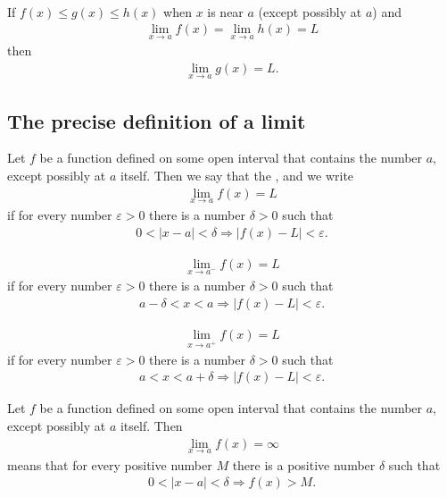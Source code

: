 \documentclass{article}
\begin{document}
\begin{theorem}
    \\
    If $f(x)\leq g(x)\leq h(x)$ when $x$ is near $a$ (except possibly at $a$) and
    \begin{align*}
        \lim_{x\to a}f(x) = \lim_{x\to a}h(x) = L
    \end{align*}
    then
    \begin{align*}
        \lim_{x \to a}g(x) = L.
    \end{align*}
\end{theorem}
\subsection{The precise definition of a limit}
\begin{definition}
    Let $f$ be a function defined on some open interval that contains the number $a$, except possibly at $a$ itself. Then we say that the , and we write
    \begin{align*}
        \lim_{x\to a}f(x) = L
    \end{align*}
    if for every number $\varepsilon>0$ there is a number $\delta>0$ such that
    \begin{align*}
        0<|x-a|<\delta \Rightarrow |f(x)-L|<\varepsilon.
    \end{align*}
\end{definition}
\begin{definition}
    \begin{align*}
        \lim_{x\to a^-}f(x) = L
    \end{align*}
    if for every number $\varepsilon > 0$ there is a number $\delta > 0$ such that
    \begin{align*}
        a-\delta < x < a \Rightarrow |f(x)-L| < \varepsilon.
    \end{align*}
\end{definition}
\begin{align*}
    \lim_{x\to a^+}f(x) = L
\end{align*}
    if for every number $\varepsilon > 0$ there is a number $\delta > 0$ such that
\begin{align*}
    a < x < a+\delta \Rightarrow |f(x)-L| < \varepsilon.
\end{align*}
\begin{definition}
    Let $f$ be a function defined on some open interval that contains the number $a$, except possibly at $a$ itself. Then
    \begin{align*}
        \lim_{x\to a}f(x) = \infty
    \end{align*}
    means that for every positive number $M$ there is a positive number $\delta$ such that
    \begin{align*}
        0<|x-a|<\delta \Rightarrow f(x)>M.
    \end{align*}
\end{definition}
\end{document}
